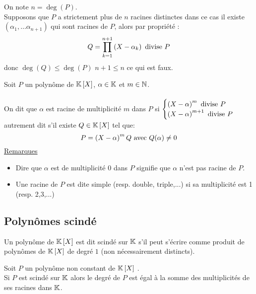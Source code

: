 \begin{dem}
    On note \(n = \deg(P)\).\\
    Supposons que \(P\) a strictement plus de \(n\) racines distinctes dans ce cas il existe \((\alpha_1, \dots \alpha_{n+1})\) qui sont racines de \(P\), alors par propriété : \[Q = \prod_{k=1}^{n+1} \left(X - \alpha_k\right) \text{ divise } P\]
    donc \(\deg(Q) \leq \deg(P)\) \ie \(n+1 \leq n\) ce qui est faux.
\end{dem}

\begin{defprop}
    Soit \(P\) un polynôme  de \(\mathbb{K}\left[X\right]\), \(\alpha \in \mathbb{K}\) et \(m \in \mathbb{N}\).\\~\\
    On dit que \(\alpha\) est racine de multiplicité \(m\) dans \(P\) si \(\begin{cases}
        \left(X-\alpha\right)^m \text{ divise } P \\
        \left(X - \alpha\right) ^{m+1} \text{ divise } P
    \end{cases}\)\\
    autrement  dit s'il existe \(Q \in \mathbb{K} \left[X\right]\) tel que: \[P = \left(X-\alpha\right)^m Q \text{ avec } Q(\alpha) \neq 0\]
    \underline{Remarques}\\
    \begin{itemize}
        \item Dire que \(\alpha\) est de multiplicité \(0\) dans \(P\) signifie que \(\alpha\) n'est pas racine de \(P\).
        \item Une racine de \(P\) est dite simple (resp. double, triple,...) si sa multiplicité est 1 (resp. 2,3,...)
    \end{itemize}
\end{defprop}
\subsection{Polynômes scindé}
\begin{defi}
    Un polynôme de \(\mathbb{K} \left[X\right]\) est dit scindé sur \(\mathbb{K}\) s'il peut s'écrire comme produit de polynômes de \(\mathbb{K} \left[X\right]\) de degré \(1\) (non nécessairement distincts).
\end{defi}
\begin{defprop}
    Soit \(P\) un polynôme non constant de \(\mathbb{K} \left[X\right]\) . \\
    Si \(P\) est scindé sur \(\mathbb{K}\) alors le degré de \(P\) est égal à la somme des multiplicités de ses racines dans \(\mathbb{K}\).
\end{defprop}

